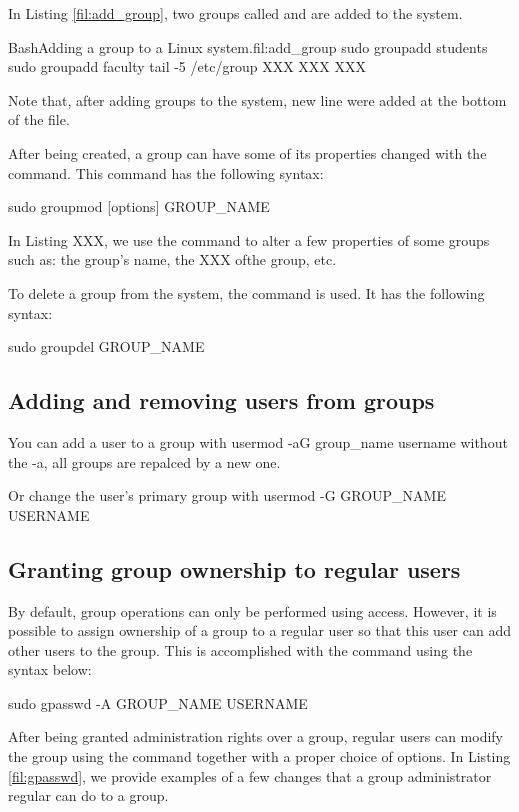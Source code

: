 In Listing \ref{fil:add_group}, two groups called  and  are added to the system.
\begin{command_line_float}{Bash}{Adding a group to a Linux system.}{fil:add_group}
sudo groupadd students
sudo groupadd faculty
tail -5 /etc/group
XXX
XXX
XXX
\end{command_line_float}
Note that, after adding groups to the system, new line were added at the bottom of the  file. 

After being created, a group can have some of its properties changed with the  command. This command has the following syntax:
\begin{command_line}
sudo groupmod [options] GROUP_NAME
\end{command_line}

In Listing XXX, we use the  command to alter a few properties of some groups such as: the group's name, the XXX ofthe group, etc. 
\begin{command_line_float}{Bash}{Changing group properties with .}{fil:group_mod}
sudo groupmod -n new\_name old\_name}
XXX
\end{command_line_float}


To delete a group from the system, the  command is used. It has the following syntax:
\begin{command_line}
sudo groupdel GROUP_NAME
\end{command_line}

\subsection{Adding and removing users from groups}

You can add a user to a group with usermod -aG group\_name username
without the -a, all groups are repalced by a new one.

Or change the user's primary group with usermod -G GROUP\_NAME USERNAME

\subsection{Granting group ownership to regular users}

By default, group operations can only be performed using  access. However, it is possible to assign ownership of a group to a regular user so that this user can add other users to the group. This is accomplished with the  command using the syntax below:
\begin{command_line}
sudo gpasswd -A GROUP_NAME USERNAME
\end{command_line}
After being granted administration rights over a group, regular users can modify the group using the  command together with a proper choice of options. In Listing \ref{fil:gpasswd}, we provide examples of a few changes that a group administrator regular  can do to a group. 

